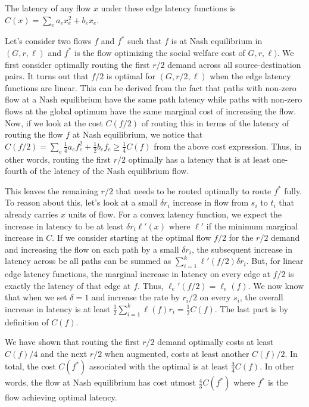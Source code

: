 \begin{proof-sketch}
    The latency of any flow $x$ under these edge latency functions is $C(x) = \displaystyle \sum_e a_ex^2_e + b_ex_e$.

    Let's consider two flows $f$ and $f^*$ such that $f$ is at Nash equilibrium in $(G, r, \ell)$ and $f^*$ is the flow optimizing the social welfare cost of $G,r,\ell)$. We first consider optimally routing the first $r/2$ demand 
    across all source-destination pairs. It turns out that $f/2$ is optimal for $(G, r/2,\ell)$ when the edge latency functions are linear. This can be derived from the fact that paths with
    non-zero flow at a Nash equilibrium have the same path latency while paths with non-zero flows at the global optimum have the same marginal cost of increasing the flow. Now, if we look at the cost
    $C(f/2)$ of routing this in terms of the latency of routing the flow $f$ at Nash equilibrium, we notice that $C(f/2) = \displaystyle \sum_e \frac{1}{4}a_ef^2_e + \frac{1}{2}b_ef_e \geq \frac{1}{4}C(f)$
    from the above cost expression. Thus, in other words, routing the first $r/2$ optimally has a latency that is at least one-fourth of the latency of the Nash equilibrium flow.

    This leaves the remaining $r/2$ that needs to be routed optimally to route $f^*$ fully. To reason about this, let's look at a small $\delta r_i$ increase in flow from $s_i$ to $t_i$ that already carries $x$ units 
    of flow. For a convex latency function, we expect the increase in latency to be at least $\delta r_i\ell'(x)$ where $\ell'$ if the minimum marginal increase in $C$. If we consider starting at the 
    optimal flow $f/2$ for the $r/2$ demand and increasing the flow on each path by a small $\delta r_i$, the subsequent increase in 
    latency across be all paths can be summed as  $\displaystyle \sum_{i = 1}^k\ell'(f/2)\delta r_i$. But, for linear edge latency functions, the marginal increase in latency on every edge at $f/2$ is exactly
    the latency of that edge at $f$. Thus, $\ell_e'(f/2) = \ell_e(f)$. We now know that when we set $\delta = 1$ and increase the rate by $r_i/2$ on every $s_i$, the overall increase in latency is at least $\displaystyle \frac{1}{2}\sum_{i= 1}^k\ell(f)r_i = \frac{1}{2}C(f)$. The last part is by definition of $C(f)$. 
    
    We have shown that routing the first $r/2$ demand optimally costs at least $C(f)/4$ and the next $r/2$ when augmented, costs at least another $C(f)/2$. In total, the cost $C(f^*)$ associated with the optimal is at least $\frac{3}{4}C(f)$. In other words,
    the flow at Nash equilibrium has cost utmost $\frac{4}{3}C(f^*)$ where $f^*$ is the flow achieving optimal latency.
\end{proof-sketch}
